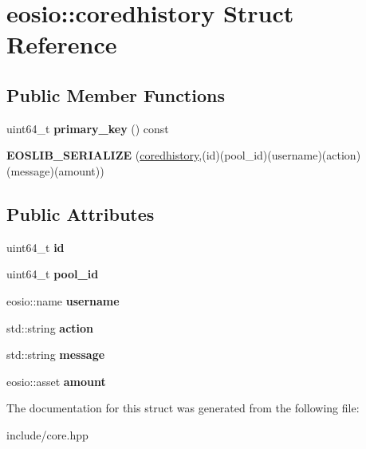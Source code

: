 \hypertarget{structeosio_1_1coredhistory}{}\section{eosio\+:\+:coredhistory Struct Reference}
\label{structeosio_1_1coredhistory}
\subsection*{Public Member Functions}
\begin{DoxyCompactItemize}
\item 
\mbox{\label{structeosio_1_1coredhistory_adbe84e783a42ebcb788fdd910f259646}} 
uint64\+\_\+t {\bfseries primary\+\_\+key} () const
\item 
\mbox{\label{structeosio_1_1coredhistory_a24f091eb4c574db60dff2ba1a6f273fa}} 
{\bfseries E\+O\+S\+L\+I\+B\+\_\+\+S\+E\+R\+I\+A\+L\+I\+ZE} (\mbox{\hyperlink{structeosio_1_1coredhistory}{coredhistory}},(id)(pool\+\_\+id)(username)(action)(message)(amount))
\end{DoxyCompactItemize}
\subsection*{Public Attributes}
\begin{DoxyCompactItemize}
\item 
\mbox{\label{structeosio_1_1coredhistory_a1ccf8a1376acb90ea86a628c93e2497f}} 
uint64\+\_\+t {\bfseries id}
\item 
\mbox{\label{structeosio_1_1coredhistory_a0a2eab7aed4c79709bb4cbe481d2ad00}} 
uint64\+\_\+t {\bfseries pool\+\_\+id}
\item 
\mbox{\label{structeosio_1_1coredhistory_a613efec9996b774e1e6b3220ab0b641a}} 
eosio\+::name {\bfseries username}
\item 
\mbox{\label{structeosio_1_1coredhistory_ac0a104c1e7f081a6f384cf35a5d1bf14}} 
std\+::string {\bfseries action}
\item 
\mbox{\label{structeosio_1_1coredhistory_a32c8c7822b2efa57a2fbd5e4b56686ba}} 
std\+::string {\bfseries message}
\item 
\mbox{\label{structeosio_1_1coredhistory_a46315551cfd5ab25f536683962b31c87}} 
eosio\+::asset {\bfseries amount}
\end{DoxyCompactItemize}


The documentation for this struct was generated from the following file\+:\begin{DoxyCompactItemize}
\item 
include/core.\+hpp\end{DoxyCompactItemize}
